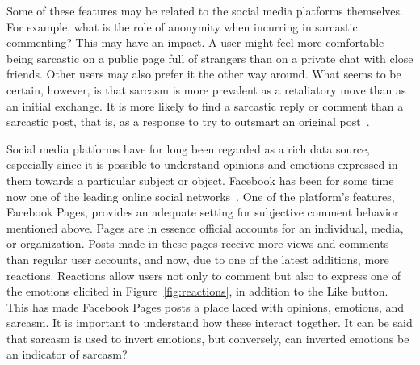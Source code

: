 \documentclass[12pt,a4paper]{report}
\theoremstyle{definition}
\begin{document}
\begin{CJK}{UTF8}{bsmi}
    \par Some of these features may be related to the social media platforms themselves.
    For example, what is the role of anonymity when incurring in sarcastic commenting? This may have an impact.
    A user might feel more comfortable being sarcastic on a public page full of strangers than on a private chat with close friends.
    Other users may also prefer it the other way around.
    What seems to be certain, however, is that sarcasm is more prevalent as a retaliatory move than as an initial exchange.
    It is more likely to find a sarcastic reply or comment than a sarcastic post, that is, as a response to try to outsmart an original post~\cite{mueller2016positive}.
    \par Social media platforms have for long been regarded as a rich data source, especially since it is possible to understand opinions and emotions expressed in them towards a particular subject or object.
    Facebook has been for some time now one of the leading online social networks~\cite{wilson2012review}.
    One of the platform's features, Facebook Pages, provides an adequate setting for subjective comment behavior mentioned above.
    Pages are in essence official accounts for an individual, media, or organization.
    Posts made in these pages receive more views and comments than regular user accounts, and now, due to one of the latest additions, more reactions.
    Reactions allow users not only to comment but also to express one of the emotions elicited in Figure~\ref{fig:reactions}, in addition to the Like button.
    This has made Facebook Pages posts a place laced with opinions, emotions, and sarcasm.
    It is important to understand how these interact together.
    It can be said that sarcasm is used to invert emotions, but conversely, can inverted emotions be an indicator of sarcasm?


\end{CJK}
\end{document}
